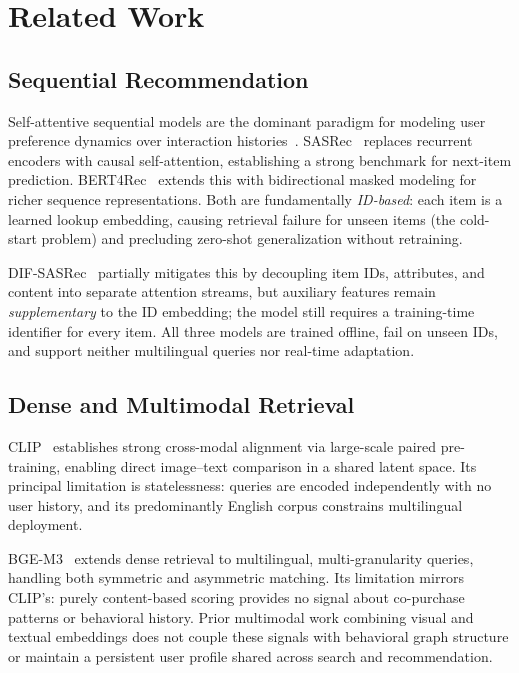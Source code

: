 \section{Related Work}
\label{sec:related}

\subsection{Sequential Recommendation}
Self-attentive sequential models are the dominant paradigm for modeling
user preference dynamics over interaction histories~\cite{kang2018self,sun2019bert4rec}.
SASRec~\cite{kang2018self} replaces recurrent encoders with causal
self-attention, establishing a strong benchmark for next-item prediction.
BERT4Rec~\cite{sun2019bert4rec} extends this with bidirectional masked
modeling for richer sequence representations.
Both are fundamentally \emph{ID-based}: each item is a learned lookup
embedding, causing retrieval failure for unseen items (the cold-start problem)
and precluding zero-shot generalization without retraining.

DIF-SASRec~\cite{xie2022difsr} partially mitigates this by decoupling item
IDs, attributes, and content into separate attention streams, but auxiliary
features remain \emph{supplementary} to the ID embedding; the model still
requires a training-time identifier for every item.
All three models are trained offline, fail on unseen IDs, and support neither
multilingual queries nor real-time adaptation.

\subsection{Dense and Multimodal Retrieval}
CLIP~\cite{radford2021clip} establishes strong cross-modal alignment via
large-scale paired pre-training, enabling direct image--text comparison in a
shared latent space. Its principal limitation is statelessness: queries are
encoded independently with no user history, and its predominantly English
corpus constrains multilingual deployment.

BGE-M3~\cite{chen2024bgem3} extends dense retrieval to multilingual,
multi-granularity queries, handling both symmetric and asymmetric matching.
Its limitation mirrors CLIP's: purely content-based scoring provides no signal
about co-purchase patterns or behavioral history.
Prior multimodal work combining visual and textual embeddings does not couple
these signals with behavioral graph structure or maintain a persistent user
profile shared across search and recommendation.

